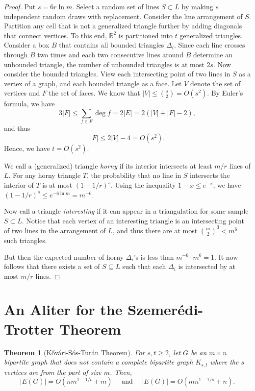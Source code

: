 \documentclass[10pt,reqno]{amsart}
\newtheorem{theorem}{Theorem}[section]
\theoremstyle{definition}
\theoremstyle{remark}
\renewcommand{\leq}{\leqslant}
\renewcommand{\geq}{\geqslant}
\def\R{\mathbb{R}}
\numberwithin{equation}{section}
\begin{document}
\begin{proof}
	Put $s = 6r\ln m$. Select a random set of lines $S \subset L$ by making $s$ independent random draws with replacement. Consider the line arrangement of $S$. Partition any cell that is not a generalized triangle further by adding diagonals that connect vertices. To this end, $\R^2$ is partitioned into $t$ generalized triangles. Consider a box $B$ that contains all bounded triangles $\Delta_i$. Since each line crosses through $B$ two times and each two consecutive lines around $B$ determine an unbounded triangle, the number of unbounded triangles is at most $2s$. Now consider the bounded triangles. View each intersecting point of two lines in $S$ as a vertex of a graph, and each bounded triangle as a face. Let $V$ denote the set of vertices and $F$ the set of faces. We know that $|V| \leq \binom{s}{2} = O(s^2)$. By Euler's formula, we have
	\[
		3|F| \leq \sum_{f \in F} \deg f = 2|E| = 2(|V| + |F| - 2),
	\]
	and thus 
	\[
		|F| \leq 2|V| - 4 = O(s^2).
	\]
	Hence, we have $t = O(s^2)$. 
	
	We call a (generalized) triangle \textit{horny} if its interior intersects at least $m/r$ lines of $L$. For any horny triangle $T$, the probability that no line in $S$ intersects the interior of $T$ is at most $(1 - 1/r)^s$. Using the inequality $1 - x \leq e^{-x}$, we have $(1 - 1/r)^s \leq e^{-6\ln m} = m^{-6}$. 

	Now call a triangle \textit{interesting} if it can appear in a triangulation for some sample $S \subset L$. Notice that each vertex of an interesting triangle is an intersecting point of two lines in the arrangement of $L$, and thus there are at most $\binom{m}{2}^3 < m^6$ such triangles. 

	But then the expected number of horny $\Delta_i$'s is less than $m^{-6} \cdot m^{6} = 1$. It now follows that there exists a set of $S \subseteq L$ such that each $\Delta_i$ is intersected by at most $m/r$ lines.
\end{proof}

\newpage

\section{An Aliter for the Szemerédi-Trotter Theorem}

\begin{theorem}[Kővári-Sós-Turán Theorem]
	For $s, t \geq 2$, let $G$ be an $m \times n$ bipartite graph that does not contain a complete bipartite graph $K_{s, t}$ where the $s$ vertices are from the part of size $m$. Then,
	\[
		|E(G)| = O(nm^{1 - 1/t} + m) \quad \text{ and } \quad |E(G)| = O(mn^{1 - 1/s} + n).
	\]
\end{theorem}
\end{document}
